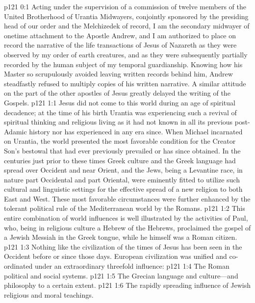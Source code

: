 \author{Midwayer Commission}
\vs p121 0:1 Acting under the supervision of a commission of twelve members of the United Brotherhood of Urantia Midwayers, conjointly sponsored by the presiding head of our order and the Melchizedek of record, I am the secondary midwayer of onetime attachment to the Apostle Andrew, and I am authorized to place on record the narrative of the life transactions of Jesus of Nazareth as they were observed by my order of earth creatures, and as they were subsequently partially recorded by the human subject of my temporal guardianship. Knowing how his Master so scrupulously avoided leaving written records behind him, Andrew steadfastly refused to multiply copies of his written narrative. A similar attitude on the part of the other apostles of Jesus greatly delayed the writing of the Gospels.\plusone
{}
\vs p121 1:1 Jesus did not come to this world during an age of spiritual decadence; at the time of his birth Urantia was experiencing such a revival of spiritual thinking and religious living as it had not known in all its previous post\hyp{}Adamic history nor has experienced in any era since. When Michael incarnated on Urantia, the world presented the most favorable condition for the Creator Son’s bestowal that had ever previously prevailed or has since obtained. In the centuries just prior to these times Greek culture and the Greek language had spread over Occident and near Orient, and the Jews, being a Levantine race, in nature part Occidental and part Oriental, were eminently fitted to utilize such cultural and linguistic settings for the effective spread of a new religion to both East and West. These most favorable circumstances were further enhanced by the tolerant political rule of the Mediterranean world by the Romans.
\vs p121 1:2 This entire combination of world influences is well illustrated by the activities of Paul, who, being in religious culture a Hebrew of the Hebrews, proclaimed the gospel of a Jewish Messiah in the Greek tongue, while he himself was a Roman citizen.
\vs p121 1:3 Nothing like the civilization of the times of Jesus has been seen in the Occident before or since those days. European civilization was unified and co\hyp{}ordinated under an extraordinary threefold influence:
\pc \vs p121 1:4 \bibnobreakspace The Roman political and social systems.
\vs p121 1:5 \bibnobreakspace The Grecian language and culture---and philosophy to a certain extent.
\vs p121 1:6 \bibnobreakspace The rapidly spreading influence of Jewish religious and moral teachings.
